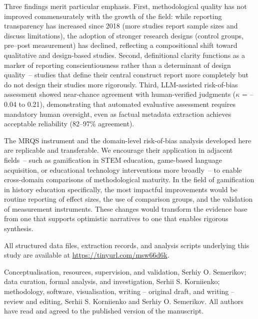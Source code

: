 \documentclass[etq]{acnsart}
\begin{document}
	Three findings merit particular emphasis. First, methodological quality has not improved commensurately with the growth of the field: while reporting transparency has increased since 2018 (more studies report sample sizes and discuss limitations), the adoption of stronger research designs (control groups, pre--post measurement) has declined, reflecting a compositional shift toward qualitative and design-based studies. Second, definitional clarity functions as a marker of reporting conscientiousness rather than a determinant of design quality~-- studies that define their central construct report more completely but do not design their studies more rigorously. Third, LLM-assisted risk-of-bias assessment showed near-chance agreement with human-verified judgments ($\kappa$ = --0.04 to 0.21), demonstrating that automated evaluative assessment requires mandatory human oversight, even as factual metadata extraction achieves acceptable reliability (82--97\% agreement).
	
	The MRQS instrument and the domain-level risk-of-bias analysis developed here are replicable and transferable. We encourage their application in adjacent fields~-- such as gamification in STEM education, game-based language acquisition, or educational technology interventions more broadly~-- to enable cross-domain comparisons of methodological maturity. In the field of gamification in history education specifically, the most impactful improvements would be routine reporting of effect sizes, the use of comparison groups, and the validation of measurement instruments. These changes would transform the evidence base from one that supports optimistic narratives to one that enables rigorous synthesis.
	
	\begin{dataavailability}
		All structured data files, extraction records, and analysis scripts underlying this study are available at \url{https://tinyurl.com/msw66d6k}.
	\end{dataavailability}
	
	\begin{authorcontributions}
		Conceptualisation, resources, supervision, and validation, Serhiy O. Semerikov; data curation, formal analysis, and investigation, Serhii S. Korniienko; methodology, software, visualisation, writing -- original draft, and writing -- review and editing, Serhii S. Korniienko and Serhiy O. Semerikov. All authors have read and agreed to the published version of the manuscript.
	\end{authorcontributions}
	
\end{document}
